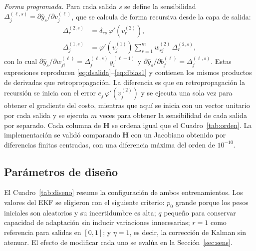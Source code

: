 \documentclass[conference]{IEEEtran}
\begin{document}
\textit{Forma programada.} Para cada salida $s$ se define la sensibilidad
$\Delta_j^{(\ell,s)}=\partial\widehat{y}_s/\partial v_j^{(\ell)}$, que se
calcula de forma recursiva desde la capa de salida:
\begin{align}
    \label{eq:sens2}
    \Delta_r^{(2,s)}&=\delta_{rs}\,\varphi'\!\left(v_r^{(2)}\right),\\
    \label{eq:sens1}
    \Delta_j^{(1,s)}&=\varphi'\!\left(v_j^{(1)}\right)\sum_{r=1}^{m}w_{rj}^{(2)}\,\Delta_r^{(2,s)},
\end{align}
con lo cual
$\partial\widehat{y}_s/\partial w_{ji}^{(\ell)}=\Delta_j^{(\ell,s)}\,y_i^{(\ell-1)}$
y $\partial\widehat{y}_s/\partial b_{j}^{(\ell)}=\Delta_j^{(\ell,s)}$. Estas
expresiones reproducen \eqref{eq:dsalida}--\eqref{eq:dbias1} y contienen los
mismos productos de derivadas que retropropagación. La diferencia es que en
retropropagación la recursión se inicia con el error
$e_j\,\varphi'(v_j^{(2)})$ y se ejecuta una sola vez para obtener el
gradiente del costo, mientras que aquí se inicia con un vector unitario por
cada salida y se ejecuta $m$ veces para obtener la sensibilidad de cada
salida por separado. Cada columna de $\mathbf{H}$ se ordena igual que el
Cuadro~\ref{tab:orden}. La implementación se validó comparando
$\mathbf{H}$ con un Jacobiano obtenido por diferencias finitas centradas,
con una diferencia máxima del orden de $10^{-10}$.

\subsection{Parámetros de diseño}
El Cuadro~\ref{tab:diseno} resume la configuración de ambos entrenamientos.
Los valores del EKF se eligieron con el siguiente criterio: $p_0$ grande
porque los pesos iniciales son aleatorios y su incertidumbre es alta; $q$
pequeño para conservar capacidad de adaptación sin inducir variaciones
innecesarias; $r=1$ como referencia para salidas en $[0,1]$; y $\eta=1$,
es decir, la corrección de Kalman sin atenuar. El efecto de modificar cada
uno se evalúa en la Sección~\ref{sec:sens}.
\end{document}
